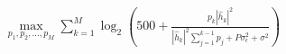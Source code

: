 \documentclass[preview]{standalone}
\begin{document}
\begin{align*}
\max_{p_1, p_2,...,p_M} \sum_{k=1}^{M} \log_2 \left( 500 + \frac{p_k\left|{\hat{h}_k}\right|^2}{\left|{\hat{h}_k}\right|^2\sum_{j=1}^{k-1}p_j+P\sigma^2_{\epsilon} + \sigma^2} \right)
\end{align*}
\end{document}
